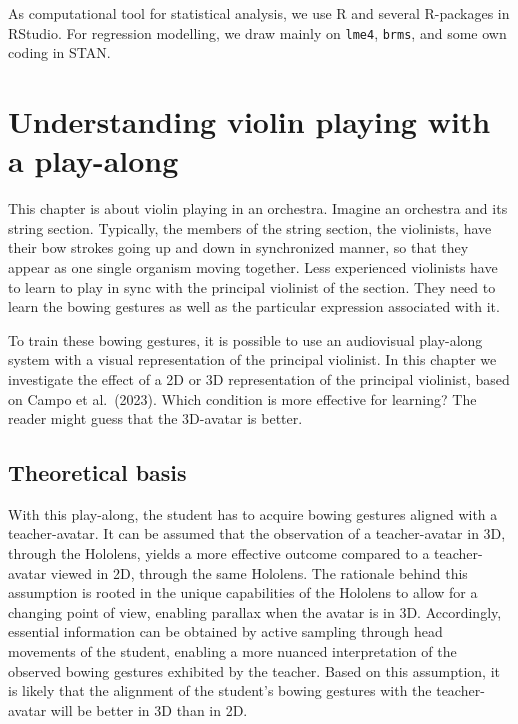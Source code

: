 \documentclass[
]{book}
\theoremstyle{definition}
\theoremstyle{definition}
\theoremstyle{definition}
\theoremstyle{definition}
\theoremstyle{remark}
\begin{document}
As computational tool for statistical analysis, we use R and several R-packages in RStudio.
For regression modelling, we draw mainly on \texttt{lme4}, \texttt{brms}, and some own coding in STAN.

\hypertarget{chapViolinist}{%
\chapter{Understanding violin playing with a play-along}\label{chapViolinist}}

This chapter is about violin playing in an orchestra.
Imagine an orchestra and its string section. Typically, the members of the string section, the violinists, have their bow strokes going up and down in synchronized manner, so that they appear as one single organism moving together. Less experienced violinists have to learn to play in sync with the principal violinist of the section. They need to learn the bowing gestures as well as the particular expression associated with it.

To train these bowing gestures, it is possible to use an audiovisual play-along system with a visual representation of the principal violinist.
In this chapter we investigate the effect of a 2D or 3D representation of the principal violinist, based on Campo et al.~(2023).
Which condition is more effective for learning? The reader might guess that the 3D-avatar is better.

\hypertarget{theoretical-basis}{%
\section{Theoretical basis}\label{theoretical-basis}}

With this play-along, the student has to acquire bowing gestures aligned with a teacher-avatar.
It can be assumed that the observation of a teacher-avatar in 3D, through the Hololens, yields a more effective outcome compared to a teacher-avatar viewed in 2D, through the same Hololens. The rationale behind this assumption is rooted in the unique capabilities of the Hololens to allow for a changing point of view, enabling parallax when the avatar is in 3D. Accordingly, essential information can be obtained by active sampling through head movements of the student, enabling a more nuanced interpretation of the observed bowing gestures exhibited by the teacher. Based on this assumption, it is likely that the alignment of the student's bowing gestures with the teacher-avatar will be better in 3D than in 2D.
\end{document}
